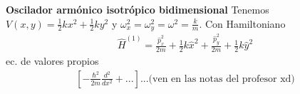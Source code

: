 \documentclass{article}
\begin{document}
\hfill 

\hfill 

\textbf{Oscilador armónico isotrópico bidimensional }
Tenemos $ V(x,y) = \frac{1}{2} k x^2 + \frac{1}{2}k y^2  $ y $ \omega_x^2 = \omega_y^2 = \omega^2 = \frac{k}{m} $. Con Hamiltoniano 
\begin{gather*}
  \hat H ^ {(1) } = \frac{\hat p_x ^2 }{2m} + \frac{1}{2}k\hat x^2 +\frac{\hat p_y ^2 }{2m} + \frac{1}{2}k\hat y^2 
\end{gather*}
ec. de valores propios 
\begin{gather*}
  \left[- \frac{\hbar ^2}{2m } \frac{d ^2  }{d x^2 } + ...\right]... \text{(ven en las notas del profesor xd)} 
\end{gather*}
\end{document}

